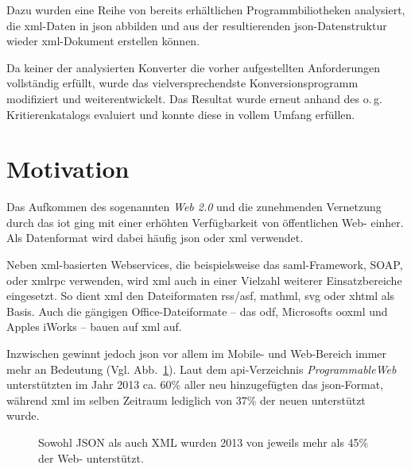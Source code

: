 Dazu wurden eine Reihe von bereits erhältlichen Programmbiliotheken analysiert,
die \acrshort{xml}-Daten in \acrshort{json} abbilden und aus der resultierenden
\acrshort{json}-Datenstruktur wieder \acrshort{xml}-Dokument erstellen können.

Da keiner der analysierten Konverter die vorher aufgestellten Anforderungen
vollständig erfüllt, wurde das vielversprechendste Konversionsprogramm
modifiziert und weiterentwickelt. Das Resultat wurde erneut anhand des o.\,g.
Kritierenkatalogs evaluiert und konnte diese in vollem Umfang erfüllen.

\section{Motivation}
\label{sec:motivation}
Das Aufkommen des sogenannten \emph{Web 2.0} und die zunehmenden Vernetzung
durch das \gls{iot} ging mit einer erhöhten
Verfügbarkeit von öffentlichen Web- einher. Als Datenformat wird dabei
häufig \acrshort{json} oder \acrshort{xml} verwendet.

Neben \acrshort{xml}-basierten Webservices, die beispielsweise das \acrshort{saml}-Framework, SOAP,
oder \gls{xmlrpc} verwenden, wird \acrshort{xml} auch in einer Vielzahl weiterer
Einsatzbereiche eingesetzt. So dient \acrshort{xml} den Dateiformaten \acrshort{rss}/\acrshort{asf}, \acrshort{mathml},
\gls{svg} oder \gls{xhtml} als Basis. Auch die gängigen
Office-Dateiformate -- das \acrfull{odf}, Microsofts %
\acrfull{ooxml} und Apples iWorks -- bauen auf \acrshort{xml} auf. %

Inzwischen gewinnt jedoch \acrshort{json} vor allem im Mobile-
und Web-Bereich immer mehr an Bedeutung (Vgl. Abb.~\ref{fig:xmljsonapis}). Laut dem \acrshort{api}-Verzeichnis
\emph{ProgrammableWeb} unterstützten im Jahr 2013 ca. 60\% aller neu
hinzugefügten  das \acrshort{json}-Format, während
\acrshort{xml} im selben Zeitraum lediglich von 37\% der neuen 
unterstützt wurde.~\cite{duvander2013convergence}

\begin{figure}[h!]
    \begin{center}
        
    \end{center}
    \caption{Sowohl JSON als auch XML wurden 2013 von jeweils mehr als 45\% der Web- unterstützt.}
    \label{fig:xmljsonapis}
\end{figure}


